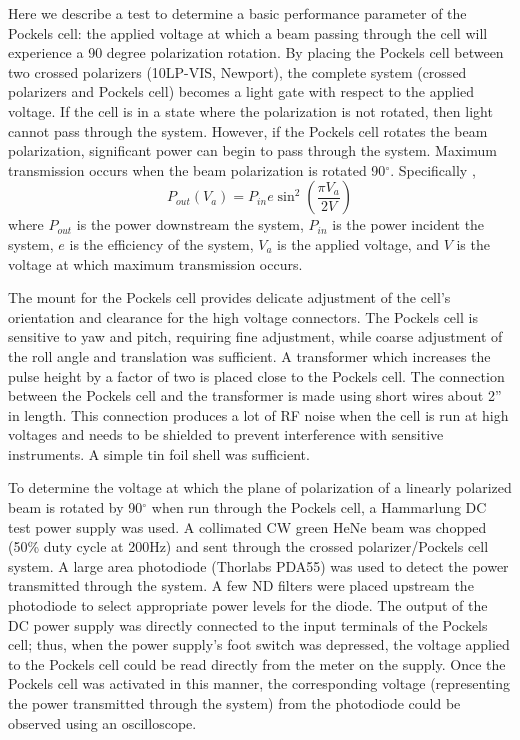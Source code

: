 \label{DC test section}


Here we describe a test to determine a basic performance parameter of the Pockels cell: the applied voltage at which a beam passing through the cell will experience a 90 degree polarization rotation. By placing the Pockels cell between two crossed polarizers (10LP-VIS, Newport), the complete system (crossed polarizers and Pockels cell) becomes a light gate with respect to the applied voltage. If the cell is in a state where the polarization is not rotated, then light cannot pass through the system. However, if the Pockels cell rotates the beam polarization, significant power can begin to pass through the system. Maximum transmission occurs when the beam polarization is rotated 90$^\circ$. Specifically \cite{Saleh:1991a},
\begin{equation}
P_{out}
(V_a)
=
P_{in} e
\sin^2
\left(
\frac{\pi V_a}{2 V}
\right)
\label{power transmitted}
\end{equation}
where ${P_{out}}$ is the power downstream the system, $P_{in}$ is the power incident the system, $e$ is the efficiency of the system, $V_a$ is the applied voltage, and $V$ is the voltage at which maximum transmission occurs.

The mount for the Pockels cell provides delicate adjustment of the cell's orientation and clearance for the high voltage connectors. The Pockels cell is sensitive to yaw and pitch, requiring fine adjustment, while coarse adjustment of the roll angle and translation was sufficient. A transformer which increases the pulse height by a factor of two is placed close to the Pockels cell. The connection between the Pockels cell and the transformer is made using short wires about 2'' in length. This connection produces a lot of RF noise when the cell is run at high voltages and needs to be shielded to prevent interference with sensitive instruments. A simple tin foil shell was sufficient.

To determine the voltage at which the plane of polarization of a linearly polarized beam is rotated by 90$^\circ$ when run through the Pockels cell, a Hammarlung DC test power supply was used. A collimated CW green HeNe beam was chopped (50\% duty cycle at 200Hz) and sent through the crossed polarizer/Pockels cell system. A large area photodiode (Thorlabs PDA55) was used to detect the power transmitted through the system. A few ND filters were placed upstream the photodiode to select appropriate power levels for the diode. The output of the DC power supply was directly connected to the input terminals of the Pockels cell; thus, when the power supply's foot switch was depressed, the voltage applied to the Pockels cell could be read directly from the meter on the supply. Once the Pockels cell was activated in this manner, the corresponding voltage (representing the power transmitted through the system) from the photodiode could be observed using an oscilloscope.

